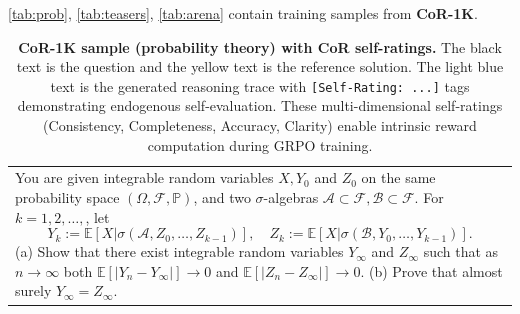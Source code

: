 \documentclass{article}
\theoremstyle{plain}
\theoremstyle{definition}
\theoremstyle{remark}
\newcommand{\data}{\textbf{CoR-1K}}
\begin{document}
\autoref{tab:prob}, \autoref{tab:teasers}, \autoref{tab:arena} contain training samples from \data{}.

\newpage

\begin{longtable}{@{}p{\textwidth}@{}}
\caption{\textbf{\data{} sample (probability theory) with CoR self-ratings.} The black text is the question and the \textcolor{olmoeDarkYellow}{yellow} text is the reference solution. The \textcolor{defaultlightblue}{light blue} text is the generated reasoning trace with \texttt{[Self-Rating: ...]} tags demonstrating endogenous self-evaluation. These multi-dimensional self-ratings (Consistency, Completeness, Accuracy, Clarity) enable intrinsic reward computation during GRPO training.} 
\label{tab:prob} \\
\toprule

You are given integrable random variables \( X, Y_0 \) and \( Z_0 \) on the same probability space \( (\Omega, \mathcal{F}, \mathbb{P}) \), and two \( \sigma \)-algebras \( \mathcal{A} \subset \mathcal{F}, \mathcal{B} \subset \mathcal{F}. \) For \( k = 1, 2, \ldots, \), let \[ Y_k := \mathbb{E}[X|\sigma(\mathcal{A}, Z_0, \ldots, Z_{k-1})] , \quad Z_k := \mathbb{E}[X|\sigma(\mathcal{B}, Y_0, \ldots, Y_{k-1})] . \] (a) Show that there exist integrable random variables \( Y_\infty \) and \( Z_\infty \) such that as \( n \to \infty \) both \( \mathbb{E}[|Y_n - Y_\infty|] \to 0 \) and \( \mathbb{E}[|Z_n - Z_\infty|] \to 0 \). (b) Prove that almost surely \( Y_\infty = Z_\infty. \)

\\


\end{longtable}
\end{document}
